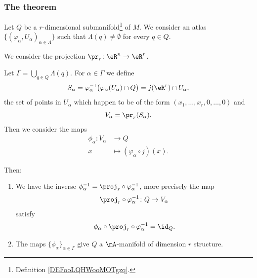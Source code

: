 \subsubsection{The theorem}


\begin{proposition}	\label{PROPooMKLBooTkqrph}
	Let \( Q\) be a \( r\)-dimensional submanifold\footnote{Definition \ref{DEFooLQHWooMOTgzq}.} of \( M\). We consider an atlas \( \{ (\varphi_{\alpha},U_{\alpha})_{\alpha\in \Lambda} \}\) such that \( \Lambda(q)\neq \emptyset\) for every \( q\in Q\).

	We consider the projection \(\pr_r \colon \eR^n\to \eR^r  \).

	Let \( \Gamma=\bigcup_{q\in Q}\Lambda(q)\). For \( \alpha\in \Gamma\) we define
	\begin{equation}
		S_{\alpha}  =\varphi_{\alpha}^{-1}\big( \varphi_{\alpha}(U_{\alpha})\cap Q \big) =j(\eR^r)\cap U_{\alpha},
	\end{equation}
	the set of points in \( U_{\alpha}\) which happen to be of the form \( (x_1,\ldots,x_r,0,\ldots,0)\) and
	\begin{equation}
		V_{\alpha}  =\pr_r(S_{\alpha}).
	\end{equation}
	Then we consider the maps
	\begin{equation}
		\begin{aligned}
			\phi_{\alpha}\colon V_{\alpha} & \to Q                                 \\
			x                              & \mapsto (\varphi_{\alpha}\circ j)(x).
		\end{aligned}
	\end{equation}


	Then:
	\begin{enumerate}
		\item		\label{ITEMooEXSEooWBMZDH}
		      We have the inverse \( \phi_{\alpha}^{-1}=\proj_r\circ\varphi_{\alpha}^{-1}\), more precisely the map
		      \begin{equation}
			      \proj_r\circ\varphi_{\alpha}^{-1} \colon Q\to V_{\alpha}
		      \end{equation}
		      satisfy
		      \begin{equation}
			      \phi_{\alpha}\circ\proj_r\circ\varphi_{\alpha}^{-1}=\id_{Q}.
		      \end{equation}
		\item
		      The maps \( \{ \phi_{\alpha} \}_{\alpha\in\Gamma}\) give \( Q\) a \( \mA\)-manifold of dimension \( r\) structure.
	\end{enumerate}
\end{proposition}

